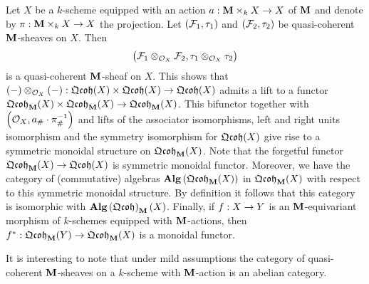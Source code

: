 \begin{remark}\label{remark:monoidal_structure_on_equivariant_sheaves}
Let $X$ be a $k$-scheme equipped with an action $a:\mathbf{M}\times_kX\rightarrow X$ of $\mathbf{M}$ and denote by $\pi:\mathbf{M}\times_kX\rightarrow X$ the projection. Let $({\mathcal F}_1,\tau_1)$ and $({\mathcal F}_2,\tau_2)$ be quasi-coherent $\mathbf{M}$-sheaves on $X$. Then 
$$\big({\mathcal F}_1\otimes_{{\mathcal O}_X}{\mathcal F}_2,\tau_1\otimes_{{\mathcal O}_X}\tau_2\big)$$
is a quasi-coherent $\mathbf{M}$-sheaf on $X$. This shows that $(-)\otimes_{{\mathcal O}_X}(-):\mathfrak{Qcoh}(X)\times \mathfrak{Qcoh}(X)\rightarrow \mathfrak{Qcoh}(X)$ admits a lift to a functor $\mathfrak{Qcoh}_{\mathbf{M}}(X)\times \mathfrak{Qcoh}_{\mathbf{M}}(X) \rightarrow \mathfrak{Qcoh}_{\mathbf{M}}(X)$. This bifunctor together with $\left({\mathcal O}_X,a_{\#}\cdot \pi_{\#}^{-1}\right)$ and lifts of the associator isomorphisms, left and right units isomorphism and the symmetry isomorphism for $\mathfrak{Qcoh}(X)$ give rise to a symmetric monoidal structure on $\mathfrak{Qcoh}_{\mathbf{M}}(X)$. Note that the forgetful functor $\mathfrak{Qcoh}_{\mathbf{M}}(X)\rightarrow \mathfrak{Qcoh}(X)$ is symmetric monoidal functor. Moreover, we have the category of (commutative) algebras $\mathbf{Alg}\left(\mathfrak{Qcoh}_{\mathbf{M}}(X)\right)$ in $\mathfrak{Qcoh}_{\mathbf{M}}(X)$ with respect to this symmetric monoidal structure. By definition it follows that this category is isomorphic with $\mathbf{Alg}\left(\mathfrak{Qcoh}\right)_{\mathbf{M}}(X)$. Finally, if $f:X\rightarrow Y$ is an $\mathbf{M}$-equivariant morphism of $k$-schemes equipped with $\mathbf{M}$-actions, then $f^*:\mathfrak{Qcoh}_{\mathbf{M}}(Y)\rightarrow \mathfrak{Qcoh}_{\mathbf{M}}(X)$ is a monoidal functor.
\end{remark}
\noindent
It is interesting to note that under mild assumptions the category of quasi-coherent $\mathbf{M}$-sheaves on a $k$-scheme with $\mathbf{M}$-action is an abelian category.

